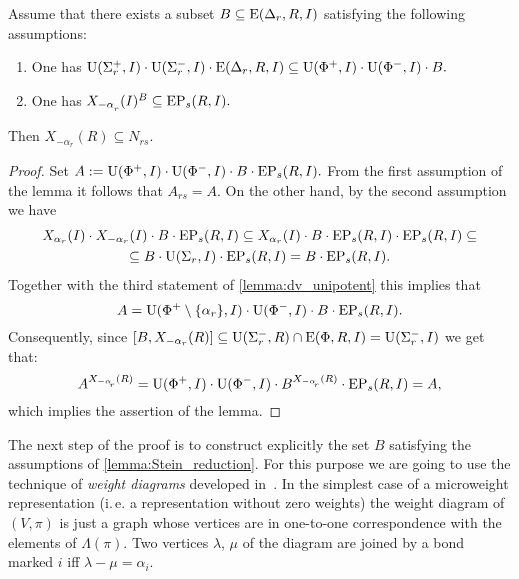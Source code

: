 
\begin{lemma}\label{lemma:Stein_reduction}
Assume that there exists a subset $B \subseteq \operatorname{E}(\Delta_r, R, I)$ satisfying the following assumptions:
\begin{enumerate}
 \item\label{stein_cond1} One has $\operatorname{U}(\Sigma^+_r, I)\cdot \operatorname{U}(\Sigma^-_r, I) \cdot \operatorname{E}(\Delta_r, R, I) \subseteq \operatorname{U}(\Phi^+, I)\cdot \operatorname{U}(\Phi^-, I) \cdot B.$
 \item\label{stein_cond2} One has $X_{-\alpha\ssub{r}}(I)^B \subseteq \EP_s(R, I).$
\end{enumerate}
Then $X_{-\alpha_r}(R) \subseteq N_{rs}.$
\end{lemma}
\begin{proof}
Set $A:=\operatorname{U}(\Phi^+, I)\cdot \operatorname{U}(\Phi^-, I) \cdot B \cdot \operatorname{EP}_s(R, I).$
From the first assumption of the lemma it follows that $A_{rs}=A$.
On the other hand, by the second assumption we have
\begin{multline*}
X_{\alpha_r}(I) \cdot X_{-\alpha_r}(I) \cdot B \cdot \operatorname{EP}_s(R, I) \subseteq 
X_{\alpha_r}(I) \cdot B \cdot \operatorname{EP}_s(R, I) \cdot \operatorname{EP}_s(R, I) \subseteq \\
\subseteq B \cdot \operatorname{U}(\Sigma_r, I) \cdot \operatorname{EP}_s(R, I) =
B \cdot \operatorname{EP}_s(R, I).
\end{multline*}
Together with the third statement of \cref{lemma:dv_unipotent} this implies that
\begin{equation*} \label{rel:sred}
A = \operatorname{U}(\Phi^+\setminus\{\alpha_r\}, I) \cdot \operatorname{U}(\Phi^-, I) \cdot B \cdot \operatorname{EP}_s(R, I).
\end{equation*}
Consequently, since $[B, X_{-\alpha_r}(R)] \subseteq \operatorname{U}(\Sigma_r^-, R) \cap \operatorname{E}(\Phi, R, I) = \operatorname{U}(\Sigma_r^-, I)$ we get that:
\begin{equation*} \label{rel:ninv} A^{X_{-\alpha\ssub{r}}(R)} = \U(\Phi^+, I) \cdot \U(\Phi^-, I) \cdot B ^{X_{-\alpha\ssub{r}}(R)} \cdot \EP_s(R, I) = A, \end{equation*}
which implies the assertion of the lemma. \end{proof}

The next step of the proof is to construct explicitly the set $B$ satisfying the assumptions of \cref{lemma:Stein_reduction}.
For this purpose we are going to use the technique of {\it weight diagrams} developed in~\cite{PSV98}.
In the simplest case of a microweight representation (i.\,e. a representation without zero weights)
the weight diagram of $(V, \pi)$ is just a graph whose vertices are in one-to-one correspondence with the elements of $\Lambda(\pi)$.
Two vertices $\lambda$, $\mu$ of the diagram are joined by a bond marked $i$ iff $\lambda-\mu = \alpha_i$.

